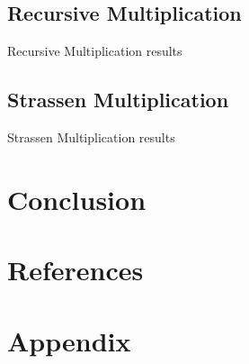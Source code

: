\documentclass[12pt, a4paper]{article}
\begin{document}
\subsection{Recursive Multiplication}
\begin{table}[p]
\begin{center}
\label{tbl:horse_rec}

\caption{Recursive Multiplication results}
\end{center}
\end{table}

\subsection{Strassen Multiplication}
\begin{table}[p]
\begin{center}
\label{tbl:horse_strassen}

\caption{Strassen Multiplication results}
\end{center}
\end{table}

\section{Conclusion}

\section{References}

\section{Appendix}
\end{document}

